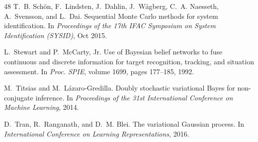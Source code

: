 \begin{thebibliography}{48}
T.~B. Sch\"{o}n, F.~Lindsten, J.~Dahlin, J.~W\r{a}gberg, C.~A. Naesseth,
  A.~Svensson, and L.~Dai.
\newblock Sequential {M}onte {C}arlo methods for system identification.
\newblock In \emph{Proceedings of the 17th IFAC Symposium on System
  Identification (SYSID)}, Oct 2015.

L.~Stewart and P.~McCarty, Jr.
\newblock Use of {B}ayesian belief networks to fuse continuous and discrete
  information for target recognition, tracking, and situation assessment.
\newblock In \emph{Proc. SPIE}, volume 1699, pages 177--185, 1992.

M.~Titsias and M.~L{\'a}zaro-Gredilla.
\newblock Doubly stochastic variational {B}ayes for non-conjugate inference.
\newblock In \emph{Proceedings of the 31st International Conference on Machine
  Learning}, 2014.

D.~Tran, R.~Ranganath, and D.~M. Blei.
\newblock The variational {G}aussian process.
\newblock In \emph{International Conference on Learning Representations}, 2016.

\end{thebibliography}

